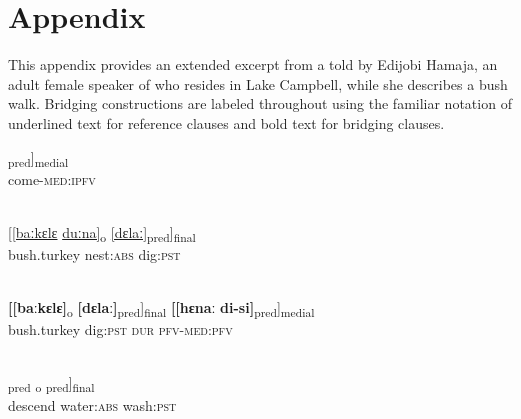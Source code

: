 \documentclass[output=paper]{LSP/langsci}
\begin{document}
\section*{Appendix}
 \setcounter{equation}{0}
This appendix provides an extended excerpt from a  told by Edijobi Hamaja, an adult
female speaker of  who resides in Lake Campbell, while she describes a bush walk. Bridging
constructions are labeled throughout using the familiar notation of underlined text for reference clauses
and bold text for bridging clauses.

\begin{exe}
\ex \label{Aiex:App21}
\gll [[jaː-nɛː]\textsubscript{pred}]\textsubscript{medial}\\
come-\textsc{med}:\textsc{ipfv}\\
\glt {}\\
\end{exe}

\begin{exe}
\ex \label{Aiex:App22}	
\gll \underline{[[baːkɛlɛ}	\underline{duːna]}\textsubscript{o}	\underline{[dɛlaː]}\textsubscript{pred}]\textsubscript{final}\\
bush.turkey	nest:\textsc{abs}	dig:\textsc{pst}\\
‎\glt {}\\
\end{exe}

\begin{exe}
\ex \label{Aiex:App23}
\gll \textbf{[[baːkɛlɛ]}\textsubscript{o}	\textbf{[dɛlaː]}\textsubscript{pred}]\textsubscript{final}	\textbf{[[hɛnaː}	\textbf{di-si]}\textsubscript{pred}]\textsubscript{medial}\\
bush.turkey	dig:\textsc{pst}		\textsc{dur}	\textsc{pfv}-\textsc{med}:\textsc{pfv}\\
‎‎\glt {}\\
\end{exe}

\begin{exe}
\ex \label{Aiex:App24}
\gll [[tilaː]\textsubscript{pred}	\underline{\smash{[haːnaː]}}\textsubscript{o}	\underline{\smash{[muːduː]}}\textsubscript{pred}]\textsubscript{final}\\
descend	water:\textsc{abs}	wash:\textsc{pst}\\
\glt {}\\
\end{exe}
\end{document}
